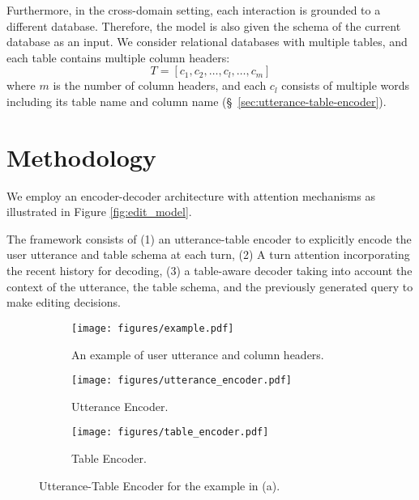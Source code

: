 \documentclass[11pt,a4paper]{article}
\newcommand{\hide}[1]{}
\begin{document}
Furthermore, in the cross-domain setting, each interaction is grounded to a different database.
Therefore, the model is also given the schema of the current database as an input.
We consider relational databases with multiple tables, and each table contains multiple column headers:
$$T = [c_1,c_2,\dots,c_l,\dots,c_m]$$
where $m$ is the number of column headers, and each $c_l$ consists of multiple words including its table name and column name (\S~\ref{sec:utterance-table-encoder}).

\section{Methodology}
We employ an encoder-decoder architecture with attention mechanisms \cite{sutskever2014sequence,luong2015effective} as illustrated in Figure \ref{fig:edit_model}.
\hide{
While based on \newcite{suhr2018learning}, our model has differences including
}
The framework consists of (1) an utterance-table encoder to explicitly encode the user utterance and table schema at each turn, (2) A turn attention incorporating the recent history for decoding, (3) a table-aware decoder taking into account the context of the utterance, the table schema, and the previously generated query to make editing decisions.

\begin{figure*}[t!]
     \centering
     \begin{subfigure}[b]{0.45\textwidth}
         \centering
         \texttt{[image: figures/example.pdf]}
         \caption{An example of user utterance and column headers.}
         \label{fig:example}
     \end{subfigure} \hfill
     \begin{subfigure}[b]{0.45\textwidth}
         \centering
         \texttt{[image: figures/utterance\_encoder.pdf]}
         \caption{Utterance Encoder.}
         \label{fig:utterance_encoder}
     \end{subfigure} \hfill
     \vfill
     \vspace{3mm}
     \begin{subfigure}[b]{\textwidth}
         \centering
         \texttt{[image: figures/table\_encoder.pdf]}
         \caption{Table Encoder.}
         \label{fig:table_encoder}
     \end{subfigure}
\caption{Utterance-Table Encoder for the example in (a).}
\vspace{-3mm}
\label{fig:table_utterance_encoder}
\end{figure*}
\end{document}
